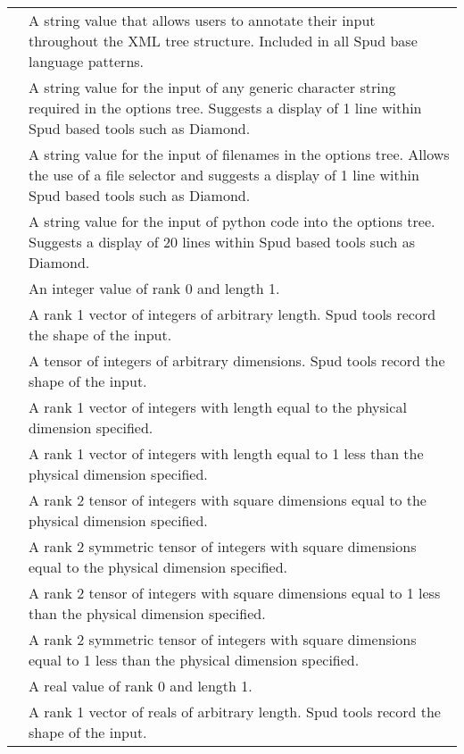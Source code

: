 \documentclass[a4paper, 11pt]{book}
\begin{document}
\noindent\begin{longtable}{lp{8cm}}
\lstinline*comment* & A string value that allows users to annotate their input throughout the XML tree structure.  Included in all Spud base language patterns. \\
\lstinline*anystring* & A string value for the input of any generic character string required in the options tree.  Suggests a display of 1 line within Spud based tools such as Diamond. \\
\lstinline*filename* & A string value for the input of filenames in the options tree.  Allows the use of a file selector and suggests a display of 1 line within Spud based tools such as Diamond. \\
\lstinline*python_code* & A string value for the input of python code into the options tree.  Suggests a display of 20 lines within Spud based tools such as Diamond. \\
\lstinline*integer* & An integer value of rank 0 and length 1. \\
\lstinline*integer_vector* & A rank 1 vector of integers of arbitrary length.  Spud tools record the shape of the input. \\
\lstinline*integer_tensor* & A tensor of integers of arbitrary dimensions.  Spud tools record the shape of the input. \\
\lstinline*integer_dim_vector* & A rank 1 vector of integers with length equal to the physical dimension specified. \\
\lstinline*integer_dim_minus_one_vector* & A rank 1 vector of integers with length equal to 1 less than the physical dimension specified. \\
\lstinline*integer_dim_tensor* & A rank 2 tensor of integers with square dimensions equal to the physical dimension specified. \\
\lstinline*integer_dim_symmetric_tensor* & A rank 2 symmetric tensor of integers with square dimensions equal to the physical dimension specified. \\
\lstinline*integer_dim_minus_one_tensor* & A rank 2 tensor of integers with square dimensions equal to 1 less than the physical dimension specified. \\
\lstinline*integer_dim_minus_one_symmetric_tensor* & A rank 2 symmetric tensor of integers with square dimensions equal to 1 less than the physical dimension specified. \\
\lstinline*real* & A real value of rank 0 and length 1. \\
\lstinline*real_vector* & A rank 1 vector of reals of arbitrary length.  Spud tools record the shape of the input. \\

\end{longtable}
\end{document}
